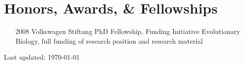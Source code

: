 


\section*{Honors, Awards, \& Fellowships}

\begin{itemize}
\item [2008] Volkswagen Stiftung PhD Fellowship, Funding Initiative
  Evolutionary Biology, full funding of research position and research
  material
\end{itemize}



\begin{center}
  \begin{small}
    Last updated: \today
  \end{small}
\end{center}

